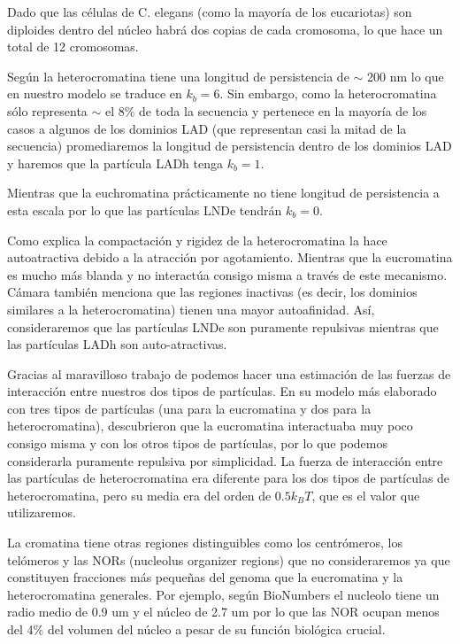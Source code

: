 Dado que las células de C. elegans (como la mayoría de los eucariotas) son diploides dentro del núcleo habrá dos copias de cada cromosoma, lo que hace un total de 12 cromosomas.

Según \cite{Bystricky2004} la heterocromatina tiene una longitud de persistencia de $\sim$ 200 nm lo que en nuestro modelo se traduce en $k_b=6$. Sin embargo, como la heterocromatina sólo representa $\sim$ el 8\% de toda la secuencia y pertenece en la mayoría de los casos a algunos de los dominios LAD (que representan casi la mitad de la secuencia) promediaremos la longitud de persistencia dentro de los dominios LAD y haremos que la partícula LADh tenga $k_b=1$.

Mientras que la euchromatina prácticamente no tiene longitud de persistencia a esta escala por lo que las partículas LNDe tendrán $k_b=0$.

Como explica \cite{Camara2023} la compactación y rigidez de la heterocromatina la hace autoatractiva debido a la atracción por agotamiento. Mientras que la eucromatina es mucho más blanda y no interactúa consigo misma a través de este mecanismo. Cámara también menciona que las regiones inactivas (es decir, los dominios similares a la heterocromatina) tienen una mayor autoafinidad. Así, consideraremos que las partículas LNDe son puramente repulsivas mientras que las partículas LADh son auto-atractivas.

Gracias al maravilloso trabajo de \cite{Falk2019} podemos hacer una estimación de las fuerzas de interacción entre nuestros dos tipos de partículas. En su modelo más elaborado con tres tipos de partículas (una para la eucromatina y dos para la heterocromatina), descubrieron que la eucromatina interactuaba muy poco consigo misma y con los otros tipos de partículas, por lo que podemos considerarla puramente repulsiva por simplicidad. La fuerza de interacción entre las partículas de heterocromatina era diferente para los dos tipos de partículas de heterocromatina, pero su media era del orden de $0.5k_BT$, que es el valor que utilizaremos.

La cromatina tiene otras regiones distinguibles como los centrómeros, los telómeros y las NORs (nucleolus organizer regions) que no consideraremos ya que constituyen fracciones más pequeñas del genoma que la eucromatina y la heterocromatina generales. Por ejemplo, según BioNumbers el nucleolo tiene un radio medio de 0.9 $\text{um}$ y el núcleo de 2.7 $\text{um}$ por lo que las NOR ocupan menos del 4\% del volumen del núcleo a pesar de su función biológica crucial.


